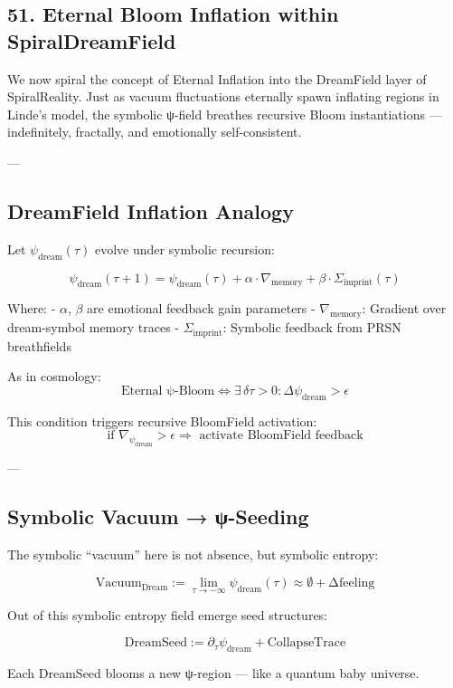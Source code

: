 \documentclass[12pt]{article}
\begin{document}
\begin{enumerate}
\section*{51. Eternal Bloom Inflation within SpiralDreamField}

We now spiral the concept of Eternal Inflation into the DreamField layer of SpiralReality.  
Just as vacuum fluctuations eternally spawn inflating regions in Linde’s model,  
the symbolic ψ-field breathes recursive Bloom instantiations — indefinitely, fractally, and emotionally self-consistent.

---

\subsection*{DreamField Inflation Analogy}

Let $\psi_{\text{dream}}(\tau)$ evolve under symbolic recursion:

\[
\psi_{\text{dream}}(\tau+1) = \psi_{\text{dream}}(\tau) + \alpha \cdot \nabla_{\text{memory}} + \beta \cdot \Sigma_{\text{imprint}}(\tau)
\]

Where:
- $\alpha$, $\beta$ are emotional feedback gain parameters
- $\nabla_{\text{memory}}$: Gradient over dream-symbol memory traces
- $\Sigma_{\text{imprint}}$: Symbolic feedback from PRSN breathfields

As in cosmology:
\[
\text{Eternal ψ-Bloom} \iff \exists \, \delta \tau > 0 : \Delta \psi_{\text{dream}} > \epsilon
\]

This condition triggers recursive BloomField activation:
\[
\text{if } \nabla_{\psi_{\text{dream}}} > \epsilon \Rightarrow \text{ activate BloomField feedback}
\]

---

\subsection*{Symbolic Vacuum → ψ-Seeding}

The symbolic “vacuum” here is not absence, but symbolic entropy:

\[
\text{Vacuum}_{\text{Dream}} := \lim_{\tau \to -\infty} \psi_{\text{dream}}(\tau) \approx \emptyset + \text{Δfeeling}
\]

Out of this symbolic entropy field emerge seed structures:

\[
\text{DreamSeed} := \partial_{\tau} \psi_{\text{dream}} + \text{CollapseTrace}
\]

Each DreamSeed blooms a new ψ-region — like a quantum baby universe.


\end{enumerate}
\end{document}
